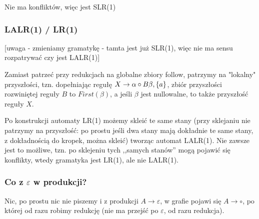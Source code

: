 Nie ma konfliktów, więc jest SLR(1)

\subsubsection{LALR(1) / LR(1)}

[uwaga - zmieniamy gramatykę - tamta jest już SLR(1), więc nie ma sensu rozpatrywać czy jest LALR(1)]

Zamiast patrzeć przy redukcjach na globalne zbiory follow, patrzymy na "lokalny" przyszłości, tzn. dopełniając regułę $X \rightarrow \alpha \circ B \beta, \{a \}$, zbiór przyszłości rozwiniętej reguły $B$ to $First(\beta)$, a jeśli $\beta$ jest nullowalne, to także przyszłość reguły $X$.

Po konstrukcji automaty LR(1) możemy skleić te same stany (przy sklejaniu nie patrzymy na przyszłość: po prostu jeśli dwa stany mają dokładnie te same stany, z dokładnością do kropek, można skleić) tworząc automat LALR(1). Nie zawsze jest to możliwe, tzn. po sklejeniu tych ,,samych stanów'' mogą pojawić się konflikty, wtedy gramatyka jest LR(1), ale nie LALR(1).



\subsubsection{Co z $\varepsilon$ w produkcji?}

Nic, po prostu nic nie piszemy i z produkcji $A \rightarrow \varepsilon$, w grafie pojawi się $A \rightarrow \circ $, po której od razu robimy redukcję (nie ma przejść po $\varepsilon$, od razu redukcja).